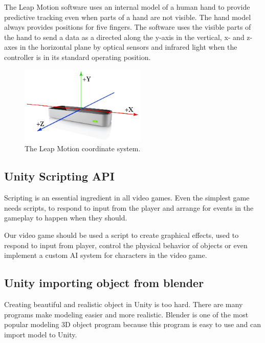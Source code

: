 \documentclass[journal]{IEEEtran}										    %
\begin{document}
                The Leap Motion software uses an internal model of a human hand 
                to provide predictive tracking even when parts of a hand are not 
                visible. The hand model always provides positions for five fingers. 
                The software uses the visible parts of the hand to send a data 
                as a directed along the y-axis in the vertical, x- and z-axes 
                in the horizontal plane by optical sensors and infrared light 
                when the controller is in its standard operating position.

                \begin{figure}[h]
                    \centering
                    \includegraphics[width=6cm]{Leap-Axes}
                    \caption{The Leap Motion coordinate system.}
                    \label{fig:leap1}
                \end{figure}
            
            \subsection{Unity Scripting API}
                Scripting is an essential ingredient in all video games. Even 
                the simplest game needs scripts, to respond to input from 
                the player and arrange for events in the gameplay to happen when 
                they should. 

                Our video game should be used a script to create graphical effects, 
                used to respond to input from player, control the physical behavior 
                of objects or even implement a custom AI system for characters 
                in the video game.
            
            \subsection{Unity importing object from blender}
                Creating beautiful and realistic object in Unity is too hard. 
                There are many programs make modeling easier and more realistic. 
                Blender is one of the most popular modeling 3D object program 
                because this program is easy to use and can import model to Unity.
\end{document}
